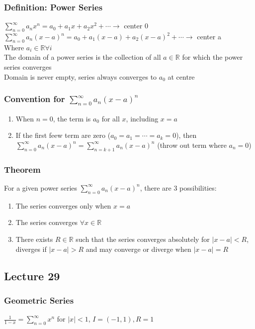 \documentclass[12pt, letterpaper]{article}
\begin{document}
\subsubsection{Definition: Power Series}
$\displaystyle\sum_{n=0}^{\infty}a_nx^n = a_0 + a_1x + a_2x^2 + \cdots\rightarrow$ center 0 \\
$\displaystyle\sum_{n=0}^{\infty}a_n(x-a)^n = a_0 + a_1(x-a) + a_2(x-a)^2 + \cdots\rightarrow$ center a \\
Where $a_i\in\mathbb{R}\forall i$ \\
The domain of a power series is the collection of all $a\in\mathbb{R}$ for which the power series converges \\
Domain is never empty, series always converges to $a_0$ at centre
\subsubsection*{Convention for $\displaystyle\sum_{n=0}^{\infty}a_n(x-a)^n$}
\begin{enumerate}
    \item When $n=0$, the term is $a_0$ for all $x$, including $x=a$
    \item If the first feew term are zero ($a_0=a_1=\cdots=a_k=0$), then $\displaystyle\sum_{n=0}^{\infty}a_n(x-a)^n = \sum_{n=k+1}^{\infty}a_n(x-a)^n$ (throw out term where $a_n = 0$)
\end{enumerate}
\subsubsection{Theorem}
For a given power series $\displaystyle\sum_{n=0}^{\infty}a_n(x-a)^n$, there are 3 possibilities:
\begin{enumerate}
    \item The series converges only when $x=a$
    \item The series converges $\forall x\in\mathbb{R}$ 
    \item There exists $R\in\mathbb{R}$ such that the series converges absolutely for $|x-a|<R$, diverges if $|x-a|>R$ and may converge or diverge when $|x-a|=R$
\end{enumerate}
\subsection{Lecture 29}
\subsubsection{Geometric Series}
$\displaystyle\frac{1}{1-x} = \sum_{n=0}^{\infty}x^n$ for $|x| < 1$, $I = (-1, 1), R = 1$
\end{document}

